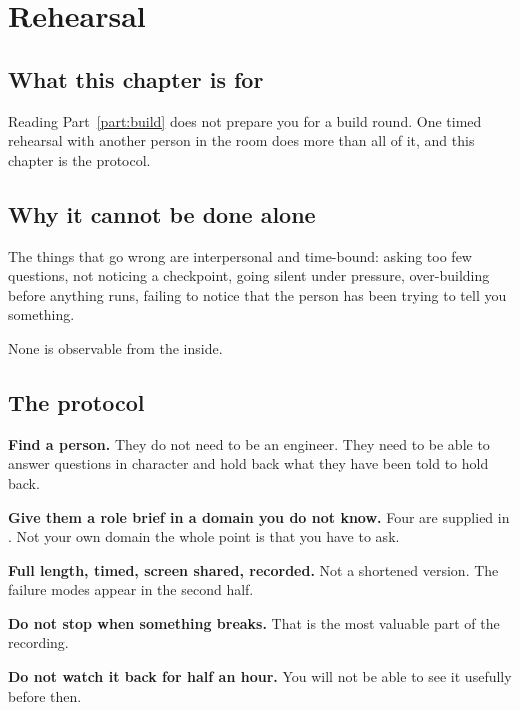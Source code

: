 \chapter{Rehearsal}
\label{ch:rehearsal}

\section*{What this chapter is for}

Reading Part~\ref{part:build} does not prepare you for a build round. One timed
rehearsal with another person in the room does more than all of it, and this
chapter is the protocol.

\section{Why it cannot be done alone}

The things that go wrong are interpersonal and time-bound: asking too few
questions, not noticing a checkpoint, going silent under pressure, over-building
before anything runs, failing to notice that the person has been trying to tell
you something.

None is observable from the inside. 

\section{The protocol}

\begin{kitmethod}
\textbf{Find a person.} They do not need to be an engineer. They need to be
able to answer questions in character and hold back what they have been told to
hold back.

\textbf{Give them a role brief in a domain you do not know.} Four are supplied
in . Not your own domain \dash{} the whole point is
that you have to ask.

\textbf{Full length, timed, screen shared, recorded.} Not a shortened version.
The failure modes appear in the second half.

\textbf{Do not stop when something breaks.} That is the most valuable part of
the recording.

\textbf{Do not watch it back for half an hour.} You will not be able to see it
usefully before then.
\end{kitmethod}

